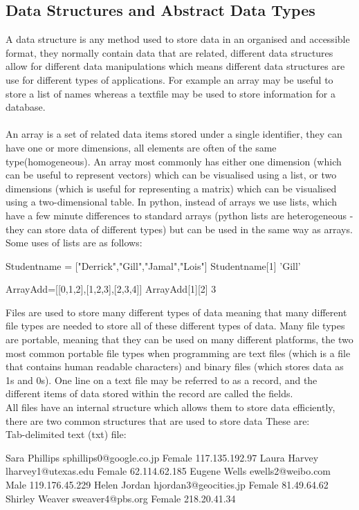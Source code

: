 \subsection{Data Structures and Abstract Data Types}
  A data structure is any method used to store data in an organised and accessible format, they normally contain data that are related, different data structures allow for different data manipulations which means different data structures are use for different types of applications. For example an array may be useful to store a list of names whereas a textfile may be used to store information for a database.\\ \\
  An array is a set of related data items stored under a single identifier, they can have one or more dimensions, all elements are often of the same type(homogeneous). An array most commonly has either one dimension (which can be useful to represent vectors) which can be visualised using a list, or two dimensions (which is useful for representing a matrix) which can be visualised using a two-dimensional table. In python, instead of arrays we use lists, which have a few minute differences to standard arrays (python lists are heterogeneous - they can store data of different types) but can be used in the same way as arrays. Some uses of lists are as follows:
  \begin{python}
Studentname = ["Derrick","Gill","Jamal","Lois"]
Studentname[1]
'Gill'

ArrayAdd=[[0,1,2],[1,2,3],[2,3,4]]
ArrayAdd[1][2]
3		\end{python}
  Files are used to store many different types of data meaning that many different file types are needed to store all of these different types of data. Many file types are portable, meaning that they can be used on many different platforms, the two most common portable file types when programming are text files (which is a file that contains human readable characters) and binary files (which stores data as 1s and 0s). One line on a text file may be referred to as a record, and the different items of data stored within the record are called the fields.\\
  All files have an internal structure which allows them to store data efficiently, there are two common structures that are used to store data These are:\\
  Tab-delimited text (txt) file:
  \begin{csv}
Sara	Phillips	sphillips0@google.co.jp	Female	117.135.192.97
Laura	Harvey	lharvey1@utexas.edu	Female	62.114.62.185
Eugene	Wells	ewells2@weibo.com	Male	119.176.45.229
Helen	Jordan	hjordan3@geocities.jp	Female	81.49.64.62
Shirley	Weaver	sweaver4@pbs.org	Female	218.20.41.34	\end{csv}
